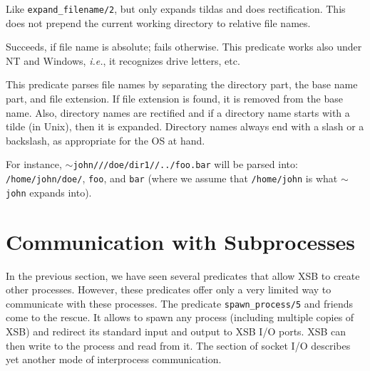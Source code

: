 \begin{description}
Like {\tt expand\_filename/2}, but only expands tildas and does
rectification. This does not prepend the current working directory to
relative file names.

  Succeeds, if file name is absolute; fails
otherwise.  This predicate works also under NT and Windows, {\it
i.e.}, it recognizes drive letters, etc.

This predicate parses file names by separating the directory part, the base
name part, and file extension. If file extension is found, it is removed
from the base name. Also, directory names are rectified and if a directory
name starts with a tilde (in Unix), then it is expanded. Directory names
always end with a slash or a backslash, as appropriate for the OS at hand.

For instance, {\tt $\sim$john///doe/dir1//../foo.bar} will be parsed into:
{\tt /home/john/doe/}, {\tt foo}, and {\tt bar} (where we assume that    
{\tt /home/john} is what {\tt $\sim$john} expands into).  



\end{description}


\section{Communication with Subprocesses}

In the previous section, we have seen several predicates that allow XSB to
create other processes. However, these predicates offer only a very
limited way to communicate with these processes. The predicate
\verb|spawn_process/5| and friends come to the rescue. It allows to spawn any
process (including multiple copies of XSB) and redirect its standard
input and output to XSB I/O ports. XSB can then write to the process and read
from it. The section of socket I/O describes yet another mode of
interprocess communication.

